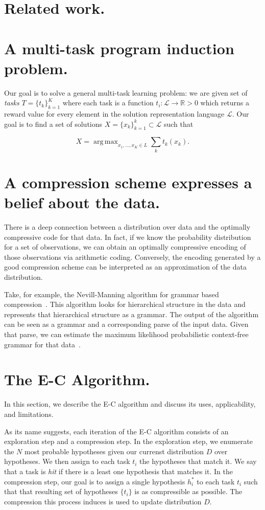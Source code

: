 \documentclass{article}
\DeclareMathOperator*{\argmax}{arg\,max}
\begin{document}
\section{Related work.}

\section{A multi-task program induction problem.}
Our goal is to solve a general multi-task learning problem: we are
given set of \emph{tasks} $T=\{t_k\}_{k=1}^K$ where each task is a
function $t_i : \mathcal{L} \rightarrow \mathds{R} > 0$ which returns
a reward value for every element in the solution representation
language $\mathcal{L}$. Our goal is to find a set of solutions
$X = \{x_k\}_{k=1}^k \subset \mathcal{L}$ such that 

\[
X = \argmax_{x_1, \dots, x_K \in L} \sum_k t_k(x_k).
\]

\section{A compression scheme expresses a belief about the data.}
There is a deep connection between a distribution over data and the
optimally compressive code for that data. In fact, if we know the
probability distribution for a set of observations, we can obtain an
optimally compressive encoding of those observations via arithmetic
coding. Conversely, the encoding generated by a good compression
scheme can be interpreted as an approximation of the data
distribution. 

Take, for example, the Nevill-Manning algorithm for grammar based
compression~\cite{nevill1997identifying}. This algorithm looks for
hierarchical structure in the data and represents that hierarchical
structure as a grammar. The output of the algorithm can be seen as a
grammar and a corresponding parse of the input data. Given that parse,
we can estimate the maximum likelihood probabilistic context-free
grammar for that data~\cite{johnson1998pcfg}. 

\section{The E-C Algorithm.}

In this section, we describe the E-C algorithm and discuss its uses,
applicability, and limitations.

As its name suggests, each iteration of the E-C algorithm consists of
an exploration step and a compression step. In the exploration step,
we enumerate the $N$ most probable hypotheses given our currenst
distribution $D$ over hypotheses. We then assign to each task $t_i$
the hypotheses that match it. We say that a task is \emph{hit} if
there is a least one hypothesis that matches it. In the compression
step, our goal is to assign a single hypothesis $h_i^*$ to each task
$t_i$ such that that resulting set of hypotheses $\{t_i\}$ is as
compressible as possible. The compression this process induces is used
to update distribution $D$.
\end{document}

